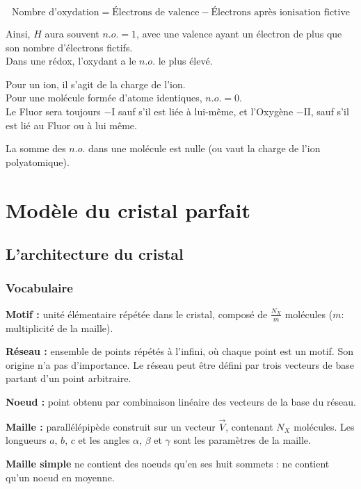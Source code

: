 \documentclass{article}
\begin{document}
$$\text{Nombre d'oxydation} = \text{Électrons de valence} - \text{Électrons après ionisation fictive}$$

Ainsi, $H$ aura souvent $n.o. = 1$, avec une valence ayant un électron de plus que son nombre d'électrons fictifs.\\
Dans une rédox, l'oxydant a le $n.o.$ le plus élevé.

Pour un ion, il s'agit de la charge de l'ion.\\
Pour une molécule formée d'atome identiques, $n.o. = 0$.\\
Le Fluor sera toujours $-\mathrm{I}$ sauf s'il est liée à lui-même, et l'Oxygène $-\mathrm{II}$, sauf s'il est lié au Fluor ou à lui même.

La somme des $n.o.$ dans une molécule est nulle (ou vaut la charge de l'ion polyatomique).




\section{Modèle du cristal parfait}\label{ch:modele-du-cristal-parfait}


\subsection{L'architecture du cristal}\label{sec:l'architecture-du-cristal}

\subsubsection{Vocabulaire}\label{subsec:vocabulaire}

\noindent\textbf{Motif :} unité élémentaire répétée dans le cristal, composé de $\frac{N_X}{m}$ molécules ($m$: multiplicité de la maille).

\noindent\textbf{Réseau :} ensemble de points répétés à l'infini, où chaque point est un motif. Son origine n'a pas d'importance.
Le réseau peut être défini par trois vecteurs de base partant d'un point arbitraire.

\noindent\textbf{Noeud :} point obtenu par combinaison linéaire des vecteurs de la base du réseau.

\noindent\textbf{Maille :} parallélépipède construit sur un vecteur $\vec V$, contenant $N_X$ molécules.
Les longueurs $a$, $b$, $c$ et les angles $\alpha$, $\beta$ et $\gamma$ sont les paramètres de la maille.

\noindent\textbf{Maille simple} ne contient des noeuds qu'en ses huit sommets : ne contient qu'un noeud en moyenne.
\end{document}
